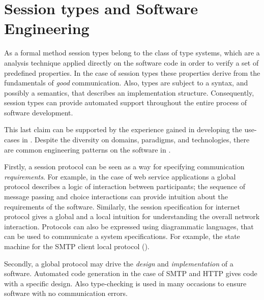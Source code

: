 \section{Session types and Software Engineering}
\label{sec:session_engineeering}




As a formal method session types belong to the class of type systems,
which are a analysis technique applied directly
on the software code in order to verify a set of predefined properties.
In the case of session types these properties derive
from the fundamentals of {\em good} communication.
Also, types are subject to a syntax,
and possibly a semantics, that describes an implementation structure.
Consequently, session types can provide automated support throughout
the entire process of software development. 

This last claim can be supported by the experience gained
in developing the use-cases in .
Despite the diversity on domains, paradigms, and technologies,
there are common engineering patterns on the software in .

Firstly, a session protocol can be seen as a way for specifying
communication {\em requirements}. For example, in the case of web service applications a global protocol describes a
logic of interaction between participants;
the sequence of message passing and choice interactions can
provide intuition about the requirements of the software.
Similarly, the session specification for internet protocol
gives a global and a local intuition for understanding
the overall network interaction. 
Protocols can also be expressed using diagrammatic languages,
that can be used to communicate a system specifications.
For example, the state machine for the SMTP client local protocol ().

Secondly, a global protocol may drive the {\em design} and
{\em implementation} of a software.
Automated code generation in the case of SMTP and HTTP
gives code with a specific design.
Also type-checking is used in many occasions to ensure
software with no communication errors.

